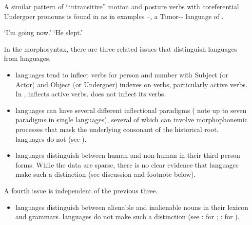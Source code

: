 A similar pattern of “intransitive” motion
and posture verbs with coreferential Undergoer pronouns is found
in  \citep[50--51, 81--84]{Banamtuan2021} as in examples --,
a Timor-- language of .

\begin{exe}
			\glt	‘I'm going now.’
						\label{ex:07-13}
			\glt	‘He slept.’
						\label{ex:07-14}
\end{exe}

In the morphosyntax, there are three related issues that distinguish
 languages from  languages.

\begin{itemize}
	\item	{} languages tend to inflect verbs for person
				and number with Subject (or Actor)
				and Object (or Undergoer) indexes on verbs, particularly active verbs.
				In ,  inflects active verbs.
				 does not inflect its verbs.
	\item	{} languages can have several different inflectional
				paradigms (\citet{Collins1982c,Collins1983} note up to seven paradigms in single languages),
				several of which can involve morphophonemic processes that mask
				the underlying consonant of the historical root.
				 languages do not
				(see ).
	\item	{} languages distinguish between human
				and non-human in their third person forms.
				While the data are sparse,
				there is no clear evidence that  languages make
				such a distinction (see discussion and footnote below).
\end{itemize}

A fourth issue is independent of the previous three.

\begin{itemize}
	\item	{} languages distinguish between alienable
				and inalienable nouns in their lexicon and grammars.
				 languages do not make such a distinction (see
				\citet[277-292]{Grimes1991c}: for ;
				\citet[280--293]{Bloyd2020}: for ).
\end{itemize}

